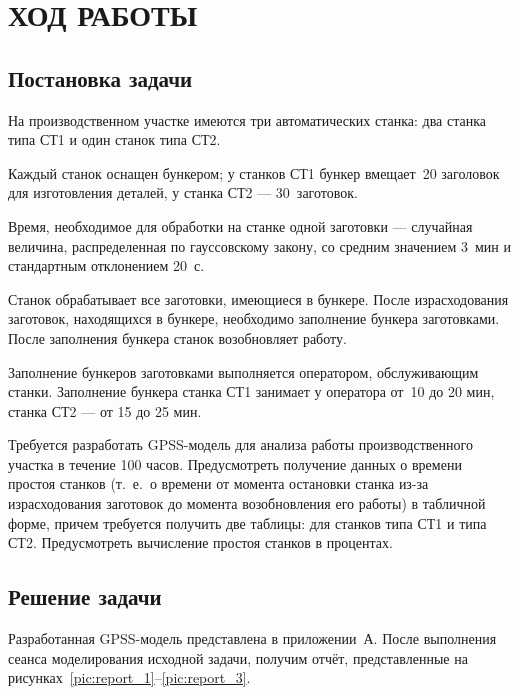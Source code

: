 \section{ХОД РАБОТЫ}

\subsection{Постановка задачи}

На производственном участке имеются три автоматических станка:
два станка типа СТ1 и один станок типа СТ2.

Каждый станок оснащен бункером; у станков СТ1 бункер вмещает~20
заголовок для изготовления деталей, у станка СТ2 --- 30 заготовок.

Время, необходимое для обработки на станке одной заготовки --- случайная
величина, распределенная по гауссовскому закону, со средним значением 3 мин
и стандартным отклонением 20 с.

Станок обрабатывает все заготовки, имеющиеся в бункере.
После израсходования заготовок, находящихся в бункере,
необходимо заполнение бункера заготовками. После заполнения бункера
станок возобновляет работу.

Заполнение бункеров заготовками выполняется оператором, обслуживающим станки.
Заполнение бункера станка СТ1 занимает у оператора от~10 до 20 мин,
станка СТ2 --- от 15 до 25 мин.

Требуется разработать GPSS-модель для анализа работы производственного участка
в течение 100 часов. Предусмотреть получение данных о времени простоя станков
(т.~е.~о времени от момента остановки станка из-за израсходования заготовок
до момента возобновления его работы) в табличной форме, причем требуется
получить две таблицы: для станков типа СТ1 и типа СТ2.
Предусмотреть вычисление простоя станков в процентах.


\subsection{Решение задачи}

Разработанная GPSS-модель представлена в приложении~А. После выполнения сеанса
моделирования исходной задачи, получим отчёт, представленные на
рисунках~\ref{pic:report_1}--\ref{pic:report_3}.

\newpage


